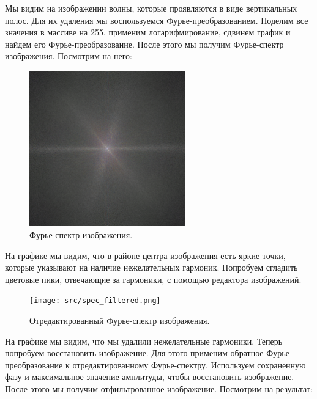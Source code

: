 \documentclass[a4paper]{article}
\begin{document}
\noindent Мы видим на изображении волны, которые проявляются в виде вертикальных полос. Для их удаления мы воспользуемся Фурье-преобразованием. Поделим все значения в массиве на 255, применим логарифмирование, сдвинем график и найдем его Фурье-преобразование. После этого мы получим Фурье-спектр изображения. Посмотрим на него:
\begin{figure}[H]
      \centering
      \includegraphics[width=0.6\textwidth]{src/spec_orig.png}
      \caption{Фурье-спектр изображения.}
\end{figure}

\noindent На графике мы видим, что в районе центра изображения есть яркие точки, которые указывают на наличие нежелательных гармоник. Попробуем сгладить цветовые пики, отвечающие за гармоники, с помощью редактора изображений. 

\begin{figure}[H]
  \centering
  \texttt{[image: src/spec\_filtered.png]}
  \caption{Отредактированный Фурье-спектр изображения.}
\end{figure}

\noindent На графике мы видим, что мы удалили нежелательные гармоники. Теперь попробуем восстановить изображение. Для этого применим обратное Фурье-преобразование к отредактированному Фурье-спектру. Используем сохраненную фазу и максимальное значение амплитуды, чтобы восстановить изображение. После этого мы получим отфильтрованное изображение. Посмотрим на результат: 
\end{document}
